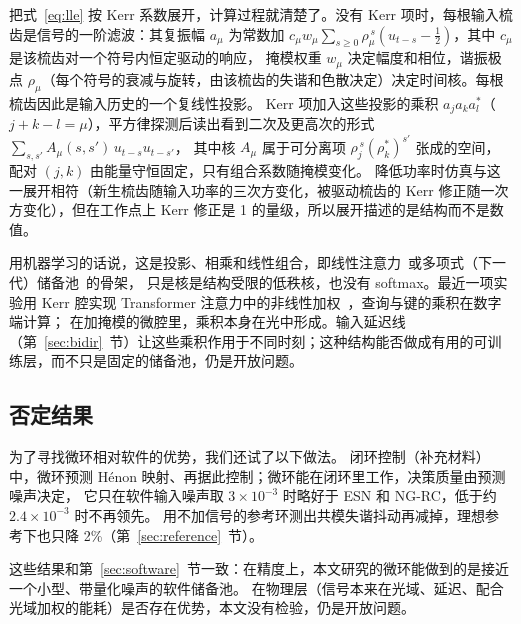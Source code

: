 把式~\eqref{eq:lle} 按 Kerr 系数展开，计算过程就清楚了。没有 Kerr 项时，每根输入梳齿是信号的一阶滤波：其复振幅 $a_\mu$ 为常数加 $c_\mu w_\mu\sum_{s\ge0}\rho_\mu^{\,s}(u_{t-s}-\tfrac12)$，其中 $c_\mu$ 是该梳齿对一个符号内恒定驱动的响应，
掩模权重 $w_\mu$ 决定幅度和相位，谐振极点 $\rho_\mu$（每个符号的衰减与旋转，由该梳齿的失谐和色散决定）决定时间核。每根梳齿因此是输入历史的一个复线性投影。
Kerr 项加入这些投影的乘积 $a_ja_ka_l^*$（$j+k-l=\mu$），平方律探测后读出看到二次及更高次的形式 $\sum_{s,s'}A_\mu(s,s')\,u_{t-s}u_{t-s'}$，
其中核 $A_\mu$ 属于可分离项 $\rho_j^{\,s}(\rho_k^*)^{s'}$ 张成的空间，配对 $(j,k)$ 由能量守恒固定，只有组合系数随掩模变化。
降低功率时仿真与这一展开相符（新生梳齿随输入功率的三次方变化，被驱动梳齿的 Kerr 修正随一次方变化），但在工作点上 Kerr 修正是 1 的量级，所以展开描述的是结构而不是数值。

用机器学习的话说，这是投影、相乘和线性组合，即线性注意力~\cite{vaswani2017,katharopoulos2020}或多项式（下一代）储备池~\cite{gauthier2021,wang2025ngrc}的骨架，
只是核是结构受限的低秩核，也没有 softmax。最近一项实验用 Kerr 腔实现 Transformer 注意力中的非线性加权~\cite{williams2026}，查询与键的乘积在数字端计算；
在加掩模的微腔里，乘积本身在光中形成。输入延迟线（第~\ref{sec:bidir}~节）让这些乘积作用于不同时刻；这种结构能否做成有用的可训练层，而不只是固定的储备池，仍是开放问题。

\subsection{否定结果}

为了寻找微环相对软件的优势，我们还试了以下做法。
闭环控制（补充材料）中，微环预测 Hénon 映射、再据此控制；微环能在闭环里工作，决策质量由预测噪声决定，
它只在软件输入噪声取 $3\times10^{-3}$ 时略好于 ESN 和 NG-RC，低于约 $2.4\times10^{-3}$ 时不再领先。
用不加信号的参考环测出共模失谐抖动再减掉，理想参考下也只降 2\%（第~\ref{sec:reference}~节）。

这些结果和第~\ref{sec:software}~节一致：在精度上，本文研究的微环能做到的是接近一个小型、带量化噪声的软件储备池。
在物理层（信号本来在光域、延迟、配合光域加权的能耗）是否存在优势，本文没有检验，仍是开放问题。
